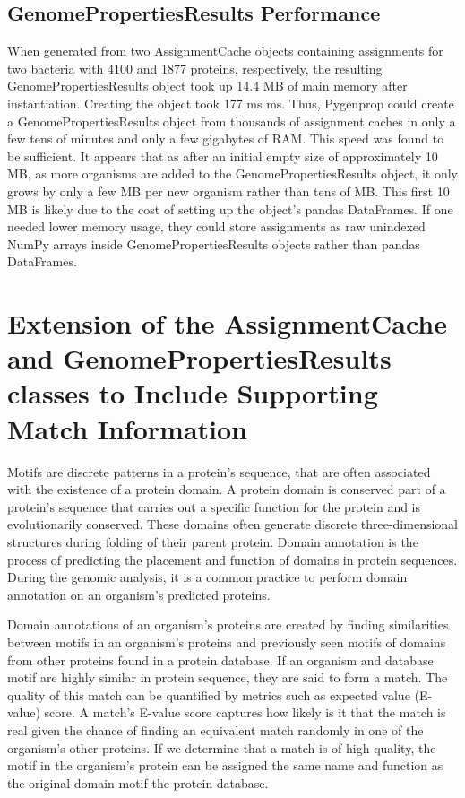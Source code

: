 \subsection{GenomePropertiesResults Performance}

When generated from two AssignmentCache objects containing assignments for two bacteria with 4100 and 1877 proteins, respectively, the resulting GenomePropertiesResults object took up 14.4 MB of main memory after instantiation. Creating the object took 177 ms  ms. Thus, Pygenprop could create a GenomePropertiesResults object from thousands of assignment caches in only a few tens of minutes and only a few gigabytes of RAM. This speed was found to be sufficient. It appears that as after an initial empty size of approximately 10 MB, as more organisms are added to the GenomePropertiesResults object, it only grows by only a few MB per new organism rather than tens of MB. This first 10 MB is likely due to the cost of setting up the object's pandas DataFrames. If one needed lower memory usage, they could store assignments as raw unindexed NumPy arrays inside GenomePropertiesResults objects rather than pandas DataFrames. 

\section{Extension of the AssignmentCache and GenomePropertiesResults classes to Include Supporting Match Information}

Motifs are discrete patterns in a protein's sequence, that are often associated with the existence of a protein domain. A protein domain is conserved part of a protein's sequence that carries out a specific function for the protein and is evolutionarily conserved. These domains often generate discrete three-dimensional structures during folding of their parent protein. Domain annotation is the process of predicting the placement and function of domains in protein sequences. During the genomic analysis, it is a common practice to perform domain annotation on an organism's predicted proteins.

Domain annotations of an organism's proteins are created by finding similarities between motifs in an organism's proteins and previously seen motifs of domains from other proteins found in a protein database. If an organism and database motif are highly similar in protein sequence, they are said to form a match. The quality of this match can be quantified by metrics such as expected value (E-value) score. A match's E-value score captures how likely is it that the match is real given the chance of finding an equivalent match randomly in one of the organism's other proteins. If we determine that a match is of high quality, the motif in the organism's protein can be assigned the same name and function as the original domain motif the protein database.

